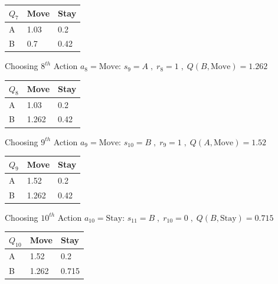 \documentclass[a4paper]{article}
\theoremstyle{definition}
\newenvironment{soln}{
    \leavevmode\color{blue}\ignorespaces
}{}
\begin{document}
\begin{enumerate}
\begin{soln}
        \begin{center}
            \begin{tabular}{ | m{5em} | m{5em}| m{5em} |} 
            \hline
            $Q_{7}$ & Move & Stay \\ 
            \hline
            A & 1.03 & 0.2  \\
            \hline
            B & 0.7 & 0.42 \\ 
            \hline
            \end{tabular}
        \end{center}
Choosing $8^{th}$ Action $a_{8} = \text{Move}$: $s_{9}=A\;,\;r_{8}=1\;,\;Q(B,\text{Move}) = 1.262$
        \begin{center}
            \begin{tabular}{ | m{5em} | m{5em}| m{5em} |} 
            \hline
            $Q_{8}$ & Move & Stay \\ 
            \hline
            A & 1.03 & 0.2  \\
            \hline
            B & 1.262 & 0.42 \\ 
            \hline
            \end{tabular}
        \end{center}
Choosing $9^{th}$ Action $a_{9} = \text{Move}$: $s_{10}=B\;,\;r_{9}=1\;,\;Q(A,\text{Move}) = 1.52$
        \begin{center}
            \begin{tabular}{ | m{5em} | m{5em}| m{5em} |} 
            \hline
            $Q_{9}$ & Move & Stay \\ 
            \hline
            A & 1.52 & 0.2  \\
            \hline
            B & 1.262 & 0.42 \\ 
            \hline
            \end{tabular}
        \end{center}
Choosing $10^{th}$ Action $a_{10} = \text{Stay}$: $s_{11}=B\;,\;r_{10}=0\;,\;Q(B,\text{Stay}) = 0.715$
        \begin{center}
            \begin{tabular}{ | m{5em} | m{5em}| m{5em} |} 
            \hline
            $Q_{10}$ & Move & Stay \\ 
            \hline
            A & 1.52 & 0.2  \\
            \hline
            B & 1.262 & 0.715 \\ 
            \hline
            \end{tabular}
        \end{center}

\end{soln}
\end{enumerate}
\end{document}
